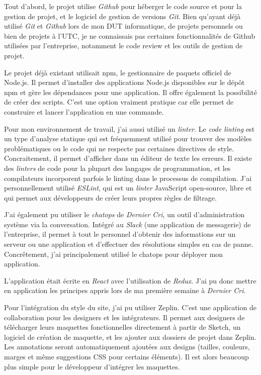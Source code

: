 \bigskip

Tout d'abord, le projet utilise \emph{Github} pour héberger le code
source et pour la gestion de projet, et le logiciel de gestion de
versions \emph{Git}. Bien qu'ayant déjà utilisé \emph{Git} et
\emph{Github} lors de mon DUT informatique, de projets personnels ou
bien de projets à l'UTC, je ne connaissais pas certaines fonctionnalités
de Github utilisées par l'entreprise, notamment le code review et les
outils de gestion de projet.

\bigskip

Le projet déjà existant utilisait npm, le gestionnaire de paquets
officiel de Node.js. Il permet d'installer des applications Node.js
disponibles sur le dépôt npm et gère les dépendances pour une
application. Il offre également la possibilité de créer des scripts.
C'est une option vraiment pratique car elle permet de construire et
lancer l'application en une commande.

\bigskip

Pour mon environnement de travail, j'ai aussi utilisé un \emph{linter}.
Le \emph{code linting} est un type d'analyse statique qui est
fréquemment utilisé pour trouver des modèles problématiques ou le code
qui ne respecte pas certaines directives de style. Concraitement, il
permet d'afficher dans un éditeur de texte les erreurs. Il existe des
\emph{linters} de code pour la plupart des langages de programmation, et
les compilateurs incorporent parfois le linting dans le processus de
compilation. J'ai personnellement utilisé \emph{ESLint}, qui est un
\emph{linter} JavaScript open-source, libre et qui permet aux
développeurs de créer leurs propres règles de filtrage.

\bigskip

J'ai également pu utiliser le \emph{chatops} de \emph{Dernier Cri}, un
outil d'administration système via la conversation. Intégré au
\emph{Slack} (une application de messagerie) de l'entreprise, il permet
à tout le personnel d'obtenir des informations sur un serveur ou une
application et d'effectuer des résolutions simples en cas de panne.
Concrêtement, j'ai principalement utilisé le chatops pour déployer mon
application.

\bigskip

L'application était écrite en \emph{React} avec l'utilisation de
\emph{Redux}. J'ai pu donc mettre en application les principes appris
lors de ma première semaine à \emph{Dernier Cri}.

\bigskip

Pour l'intégration du style du site, j'ai pu utiliser Zeplin. C'est une
application de collaboration pour les designers et les intégrateurs. Il
permet aux designers de télécharger leurs maquettes fonctionnelles
directement à partir de Sketch, un logiciel de création de maquette, et
les ajouter aux dossiers de projet dans Zeplin. Les annotations seront
automatiquement ajoutées aux designs (tailles, couleurs, marges et même
suggestions CSS pour certains éléments). Il est alors beaucoup plus
simple pour le développeur d'intégrer les maquettes.

